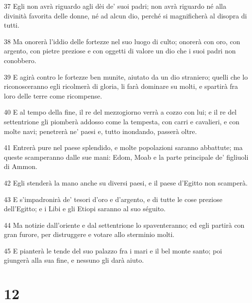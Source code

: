 \par 37 Egli non avrà riguardo agli dèi de' suoi padri; non avrà riguardo né alla divinità favorita delle donne, né ad alcun dio, perché si magnificherà al disopra di tutti.
\par 38 Ma onorerà l'iddio delle fortezze nel suo luogo di culto; onorerà con oro, con argento, con pietre preziose e con oggetti di valore un dio che i suoi padri non conobbero.
\par 39 E agirà contro le fortezze ben munite, aiutato da un dio straniero; quelli che lo riconosceranno egli ricolmerà di gloria, li farà dominare su molti, e spartirà fra loro delle terre come ricompense.
\par 40 E al tempo della fine, il re del mezzogiorno verrà a cozzo con lui; e il re del settentrione gli piomberà addosso come la tempesta, con carri e cavalieri, e con molte navi; penetrerà ne' paesi e, tutto inondando, passerà oltre.
\par 41 Entrerà pure nel paese splendido, e molte popolazioni saranno abbattute; ma queste scamperanno dalle sue mani: Edom, Moab e la parte principale de' figliuoli di Ammon.
\par 42 Egli stenderà la mano anche su diversi paesi, e il paese d'Egitto non scamperà.
\par 43 E s'impadronirà de' tesori d'oro e d'argento, e di tutte le cose preziose dell'Egitto; e i Libi e gli Etiopi saranno al suo séguito.
\par 44 Ma notizie dall'oriente e dal settentrione lo spaventeranno; ed egli partirà con gran furore, per distruggere e votare allo sterminio molti.
\par 45 E pianterà le tende del suo palazzo fra i mari e il bel monte santo; poi giungerà alla sua fine, e nessuno gli darà aiuto.

\chapter{12}

